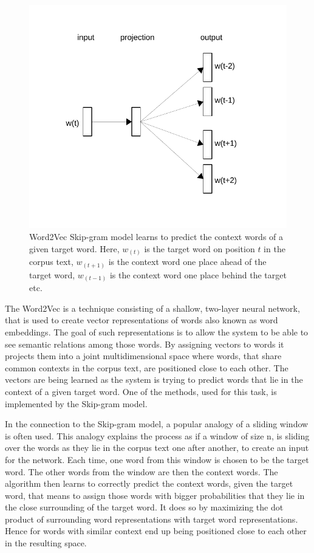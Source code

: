 \begin{figure}[H]
    \centering
    \includegraphics[scale=0.8]{obrazky-figures/skipgram.pdf}
    \caption{Word2Vec Skip-gram model learns to predict the context words of a given target word. Here, $w_{(t)}$ is the target word on position $t$ in the corpus text, $w_{(t+1)}$ is the context word one place ahead of the target word, $w_{(t-1)}$ is the context word one place behind the target etc. \cite{Word2Vec}}
\end{figure}

The Word2Vec is a technique consisting of a shallow, two-layer neural network, that is used to create vector representations of words also known as word embeddings. The goal of such representations is to allow the system to be able to see semantic relations among those words. By assigning vectors to words it projects them into a joint multidimensional space where words, that share common contexts in the corpus text, are positioned close to each other. The vectors are being learned as the system is trying to predict words that lie in the context of a given target word. One of the methods, used for this task, is implemented by the Skip-gram model. 

In the connection to the Skip-gram model, a popular analogy of a sliding window is often used. This analogy explains the process as if a window of size n, is sliding over the words as they lie in the corpus text one after another, to create an input for the network. Each time, one word from this window is chosen to be the target word. The other words from the window are then the context words. The algorithm then learns to correctly predict the context words, given the target word, that means to assign those words with bigger probabilities that they lie in the close surrounding of the target word. It does so by maximizing the dot product of surrounding word representations with target word representations. Hence for words with similar context end up being positioned close to each other in the resulting space.

